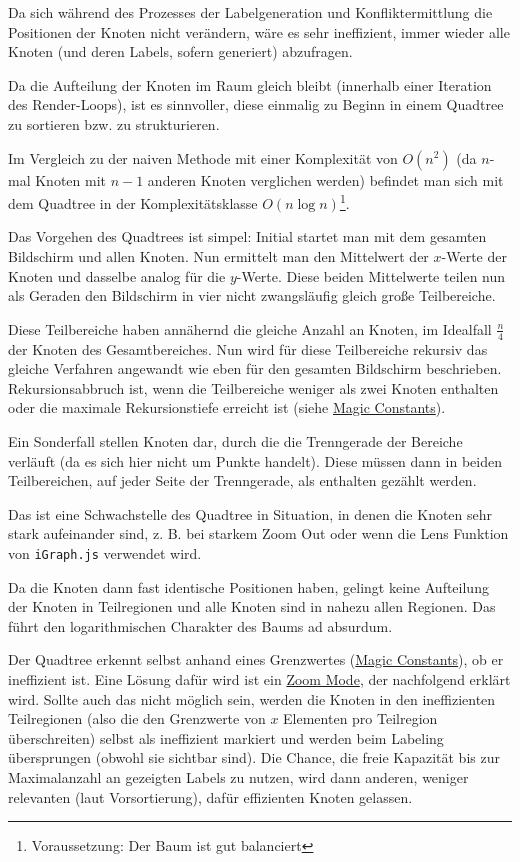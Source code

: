 
Da sich während des Prozesses der Labelgeneration und Konfliktermittlung die Positionen der Knoten nicht verändern, wäre es sehr ineffizient,
immer wieder alle Knoten (und deren Labels, sofern generiert) abzufragen.

Da die Aufteilung der Knoten im Raum gleich bleibt (innerhalb einer Iteration des Render-Loops), ist es sinnvoller, diese einmalig zu Beginn
in einem Quadtree zu sortieren bzw. zu strukturieren.

Im Vergleich zu der naiven Methode mit einer Komplexität von $O(n^2)$ (da $n$-mal Knoten mit $n-1$ anderen Knoten verglichen werden) befindet man sich mit dem Quadtree in der Komplexitätsklasse
$O(n \log n)$\footnote{ Voraussetzung: Der Baum ist gut balanciert}\cite{quadtree}.

Das Vorgehen des Quadtrees ist simpel: Initial startet man mit dem gesamten Bildschirm und allen Knoten.
Nun ermittelt man den Mittelwert der $x$-Werte der Knoten und dasselbe analog für die $y$-Werte.
Diese beiden Mittelwerte teilen nun als Geraden den Bildschirm in vier nicht zwangsläufig gleich große Teilbereiche.

Diese Teilbereiche haben annähernd die gleiche Anzahl an Knoten, im Idealfall $\frac{n}{4}$ der Knoten des Gesamtbereiches.
Nun wird für diese Teilbereiche rekursiv das gleiche Verfahren angewandt wie eben für den gesamten Bildschirm beschrieben.
Rekursionsabbruch ist, wenn die Teilbereiche weniger als zwei Knoten enthalten oder die maximale Rekursionstiefe erreicht ist (siehe \hyperref[sec:consts]{Magic Constants}).

Ein Sonderfall stellen Knoten dar, durch die die Trenngerade der Bereiche verläuft (da es sich hier nicht um Punkte handelt).
Diese müssen dann in beiden Teilbereichen, auf jeder Seite der Trenngerade, als enthalten gezählt werden.

Das ist eine Schwachstelle des Quadtree in Situation, in denen die Knoten sehr stark aufeinander sind,
z. B. bei starkem Zoom Out oder wenn die Lens Funktion von \texttt{iGraph.js} verwendet wird.

Da die Knoten dann fast identische Positionen haben, gelingt keine Aufteilung der Knoten in Teilregionen und alle Knoten sind in nahezu allen Regionen.
Das führt den logarithmischen Charakter des Baums ad absurdum.

Der Quadtree erkennt selbst anhand eines Grenzwertes (\hyperref[sec:consts]{Magic Constants}), ob er ineffizient ist.
Eine Lösung dafür wird ist ein \hyperref[subsec:zoom]{Zoom Mode}, der nachfolgend erklärt wird.
Sollte auch das nicht möglich sein, werden die Knoten in den ineffizienten Teilregionen (also die den Grenzwerte von $x$ Elementen pro Teilregion überschreiten) selbst als ineffizient markiert
und werden beim Labeling übersprungen (obwohl sie sichtbar sind). Die Chance, die freie Kapazität bis zur Maximalanzahl an gezeigten Labels zu nutzen,
wird dann anderen, weniger relevanten (laut Vorsortierung), dafür effizienten Knoten gelassen.

